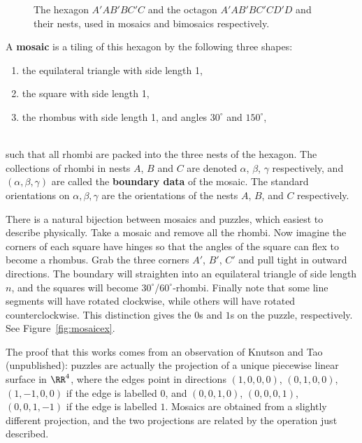%
\begin{figure}[htbp]
\begin{center}
\caption{The hexagon $A'AB'BC'C$ and the octagon $A'AB'BC'CD'D$
and their nests, used in mosaics and bimosaics respectively.} 
\label{fig:hexoct}
\end{center}
\end{figure}
%

A {\bf mosaic} is a tiling of this hexagon by the following three shapes:
\\
\parbox{3.5in}{
\begin{enumerate}
\item[(a)] the equilateral triangle with side length 1,
\item[(b)] the square with side length 1,
\item[(c)] the rhombus with side length 1, and 
angles $30^\circ$ and $150^\circ$,
\end{enumerate}
}\hspace{.5in}
\parbox{1.2in}{
}
\\
such that all rhombi are packed into the three nests of the hexagon.
The collections of rhombi in nests $A$, $B$ and $C$ are denoted 
$\alpha$, $\beta$, $\gamma$ respectively, and  $(\alpha, \beta, \gamma)$ 
are called the {\bf boundary data} of the mosaic.
The standard orientations on $\alpha, \beta, \gamma$ are the
orientations of the nests $A$, $B$, and $C$ respectively.

There is a natural bijection between mosaics and puzzles, which easiest
to describe physically.  Take a mosaic
and remove all the rhombi.  Now imagine the corners of each square have hinges
so that the angles of the square can flex to become a rhombus.  Grab the 
three corners $A'$, $B'$, $C'$ and pull tight in outward directions.  
The boundary will straighten into an equilateral
triangle of side length $n$, and the squares will become 
$30^\circ$/$60^\circ$-rhombi.  Finally note that some line segments 
will have rotated clockwise, while others will have rotated 
counterclockwise.
This distinction gives the $0$s and $1$s on the puzzle, respectively.
See Figure~\ref{fig:mosaicex}.

The proof that this works comes from an observation of Knutson and 
Tao (unpublished): puzzles 
are actually the projection of a unique piecewise linear surface in 
$\RR^4$, where
the edges point in directions
$(1,0,0,0)$, $(0,1,0,0)$, $(1,-1,0,0)$ if the edge is labelled $0$,
and
$(0,0,1,0)$, $(0,0,0,1)$, $(0,0,1,-1)$ if the edge is labelled $1$.
Mosaics are obtained from a slightly different projection, and the
two projections are related by the operation just described.

